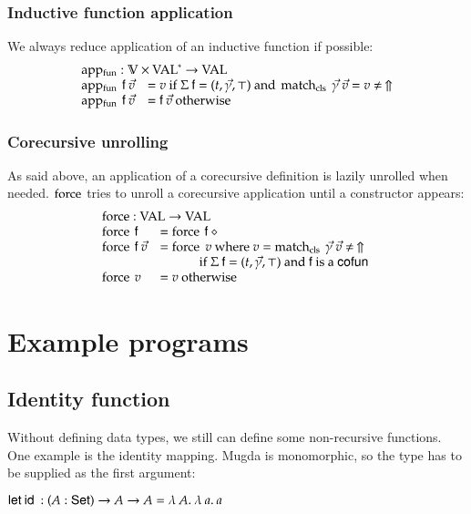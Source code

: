 \subsubsection{Inductive function application}
We always reduce application of an inductive function if possible:\[
\begin{array}{ll}
\multicolumn{2}{l}{\apf : \cV \times \ves{\Val} \ra \Val}\\
\apf \: \ff \: \vec{v} & = v \mbox{ if } \Sig \: \ff = (t,\vec{\gamma},\top) \mbox { and } \matchcls \: \vec{\gamma} \: \vec{v} = v \neq \: \stuck \\ 
\apf \: \ff \: \vec{v} & = \ff \: \vec{v} \mbox { otherwise } 
\end{array}
\]

\subsubsection{Corecursive unrolling}
As said above, an application of a corecursive definition is lazily unrolled when needed.
$\operatorname{force}$ tries to unroll a corecursive application until a constructor appears:
\[
\begin{array}{ll}
\multicolumn{2}{l}{\forc : \Val \ra \Val }\\
\forc \: \ff & = \forc \: \ff \: \diamond \\
\forc \: \ff \: \vec{v} & = \forc \; v \mbox{ where } v = \matchcls \: \vec{\gamma} \: \vec{v} \neq \: \stuck\\
& \spcx \mbox{ if } \Sig \: \ff = (t,\vec{\gamma},\top) \mbox { and } \ff \mbox { is a } \cofun\\ 
\forc \: v & = v \mbox{ otherwise}
\end{array}
\]

\section{Example programs}

\subsection{Identity function}
Without defining data types, we still can define some non-recursive functions.
One example is the identity mapping. 
Mugda is monomorphic, so the type has to be supplied as the first argument:
\begin{bsp}
$\mathsf{let}\: \mathsf{id}\: : ( A : \mathsf{Set} ) \rightarrow{A \rightarrow A} = \lambda\: A .\:\lambda\: a .\:a$   
\end{bsp}

